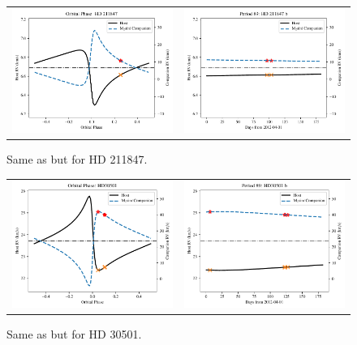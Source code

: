 \begin{figure}
    \centering
    \begin{tabular}{cc}
        \includegraphics[width=0.45\linewidth]{figures/direct-recovery/orbital-plots/HD211847_orbital_phase.pdf}&
        \includegraphics[width=0.45\linewidth]{figures/direct-recovery/orbital-plots/HD211847_p89.pdf}\\
    \end{tabular}
    \caption{Same as  but for HD 211847.}
    \label{fig:hd211847p89}
\end{figure}

\begin{figure}
    \centering
    \begin{tabular}{cc}
        \includegraphics[width=0.45\linewidth]{figures/direct-recovery/orbital-plots/HD30501_orbital_phase.pdf}&
        \includegraphics[width=0.45\linewidth]{figures/direct-recovery/orbital-plots/HD30501_p89.pdf}\\
    \end{tabular}
    \caption{Same as  but for HD 30501.}
    \label{fig:hd30501p89}
\end{figure}


